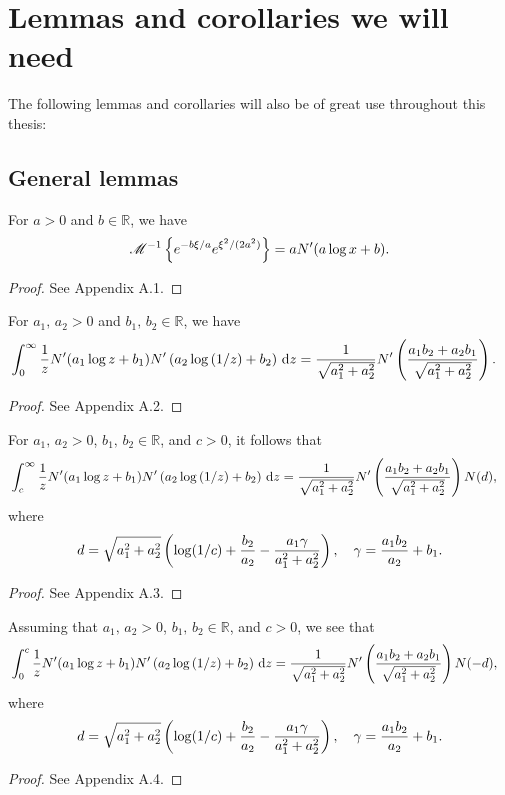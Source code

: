 \section{Lemmas and corollaries we will need}
The following lemmas and corollaries will also be of great use throughout this thesis:
\subsection{General lemmas}
	\begin{lemma}
		\label{lem:2}
	For $a > 0$ and $b \in \mathbb{R}$, we have
	\begin{equation*}
		\mathscr M^{-1}\left\{ e^{-b\xi/a}e^{\xi^2/(2a^2)} \right\} = aN'(a\log x + b).
	\end{equation*}
	\end{lemma}
\begin{proof}
	See Appendix A.1.
\end{proof}
	\begin{lemma}
		\label{lem:1}
		For $a_1, \, a_2 > 0$ and $b_1, \, b_2 \in \mathbb{R}$, we have
			\begin{align*}
				&\int_0^\infty \frac{1}{z}N'(a_1\log z + b_1)N'\left(a_2\log\left( 1/z \right) + b_2 \right) \, \mathrm d z =  \frac{1}{\sqrt{a_1^2 + a_2^2}}N'\left( \frac{a_1b_2 + a_2b_1}{\sqrt{a_1^2+a_2^2}} \right).
			\end{align*}
	\end{lemma}
	\begin{proof}
		See Appendix A.2.
	\end{proof}
	\begin{lemma}
		\label{lem:2b}
		For $a_1, \, a_2 > 0$, $b_1, \, b_2 \in \mathbb{R}$, and $c > 0$, it follows that
		\begin{align*}
			&\int_c^\infty \frac{1}{z}N'(a_1\log z + b_1)N'\left(a_2\log\left( 1/z \right) + b_2 \right) \, \mathrm d z =  \frac{1}{\sqrt{a_1^2 + a_2^2}}N'\left( \frac{a_1b_2 + a_2b_1}{\sqrt{a_1^2+a_2^2}} \right)N(d),
		\end{align*}
		where
		$$
			d = \sqrt{a_1^2+a_2^2}\left( \log(1/c) + \frac{b_2}{a_2} - \frac{a_1\gamma}{a_1^2+a_2^2} \right), \quad
			\gamma = \frac{a_1b_2}{a_2} + b_1.
		$$
	\end{lemma}
	\begin{proof}
		See Appendix A.3.
	\end{proof}
	
	\begin{lemma}
		\label{lem:2bb}
		Assuming that $a_1, \, a_2 > 0$, $b_1, \, b_2 \in \mathbb{R}$, and $c > 0$, we see that
		\begin{align*}
			&\int_0^c \frac{1}{z}N'(a_1\log z + b_1)N'\left(a_2\log\left( 1/z \right) + b_2 \right) \, \mathrm d z =  \frac{1}{\sqrt{a_1^2 + a_2^2}}N'\left( \frac{a_1b_2 + a_2b_1}{\sqrt{a_1^2+a_2^2}} \right)N(-d),
		\end{align*}
		where
		$$
			d = \sqrt{a_1^2+a_2^2}\left( \log(1/c) + \frac{b_2}{a_2} - \frac{a_1\gamma}{a_1^2+a_2^2} \right), \quad
			\gamma = \frac{a_1b_2}{a_2} + b_1.
		$$
	\end{lemma}
	\begin{proof}
		See Appendix A.4.
	\end{proof}

